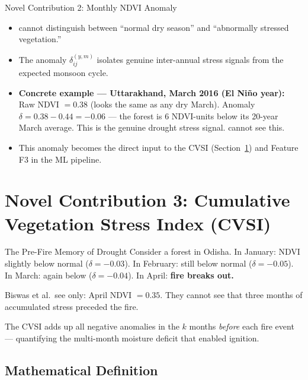 \documentclass[12pt, a4paper]{article}
\begin{document}
\begin{novelbox}{Novel Contribution 2: Monthly NDVI Anomaly}
\begin{itemize}[leftmargin=1.5em,itemsep=2pt]
  \item \citet{biswas2025} cannot distinguish between
        ``normal dry season'' and ``abnormally stressed vegetation.''
  \item The anomaly $\delta_{ij}^{(y,m)}$ isolates genuine
        inter-annual stress signals from the expected monsoon cycle.
  \item \textbf{Concrete example --- Uttarakhand, March 2016
        (El Ni\~{n}o year):}
        Raw NDVI $= 0.38$ (looks the same as any dry March).
        Anomaly $\delta = 0.38 - 0.44 = -0.06$ ---
        the forest is 6 NDVI-units below its 20-year March average.
        This is the genuine drought stress signal.
        \citet{biswas2025} cannot see this.
  \item This anomaly becomes the direct input to the CVSI
        (Section~\ref{sec:cvsi}) and Feature F3 in the ML pipeline.
\end{itemize}
\end{novelbox}

\section{Novel Contribution 3: Cumulative Vegetation Stress Index (CVSI)}
\label{sec:cvsi}

\begin{simplebox}{The Pre-Fire Memory of Drought}
Consider a forest in Odisha.
In January: NDVI slightly below normal ($\delta = -0.03$).
In February: still below normal ($\delta = -0.05$).
In March: again below ($\delta = -0.04$).
In April: \textbf{fire breaks out.}

\medskip
Biswas et al.\ see only: April NDVI $= 0.35$.
They cannot see that three months of accumulated stress preceded the fire.

The CVSI adds up all negative anomalies in the $k$ months
\emph{before} each fire event --- quantifying the multi-month
moisture deficit that enabled ignition.
\end{simplebox}

\subsection{Mathematical Definition}
\end{document}
